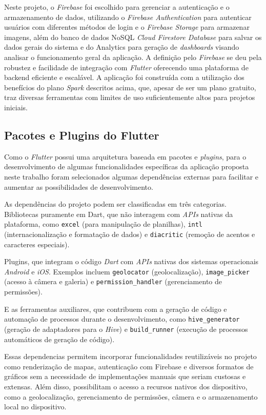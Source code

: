 Neste projeto, o \textit{Firebase} foi escolhido para gerenciar a autenticação e o armazenamento de 
dados, utilizando o \textit{Firebase Authentication} para autenticar usuários com diferentes métodos de login e 
o \textit{Firebase Storage} para armazenar imagens, além do banco de dados NoSQL 
\textit{Cloud Firestore Database} para salvar os dados gerais do sistema e do Analytics para 
geração de \textit{dashboards} visando analisar o funcionamento geral da aplicação.
A definição pelo \textit{Firebase} se deu pela robustez e facilidade de integração com \textit{Flutter} 
oferecendo uma plataforma de backend eficiente e escalável. A aplicação foi construída com a 
utilização dos benefícios do plano \textit{Spark} descritos acima,
que, apesar de ser um plano gratuito, traz diversas ferramentas com limites de uso suficientemente 
altos para projetos iniciais.

\subsection{Pacotes e Plugins do Flutter}

Como o \textit{Flutter} possui uma arquitetura baseada em pacotes e \textit{plugins}, para o desenvolvimento 
de algumas funcionalidades específicas da aplicação proposta neste trabalho foram selecionados 
algumas dependências externas para facilitar e aumentar as possibilidades de desenvolvimento.

As dependências do projeto podem ser classificadas em três categorias. Bibliotecas puramente em Dart, 
que não interagem com \textit{APIs} nativas da 
plataforma, como \texttt{excel} (para manipulação de planilhas), \texttt{intl} (internacionalização 
e formatação de dados) e \texttt{diacritic} (remoção de acentos e caracteres especiais).

Plugins, que integram o código \textit{Dart} com \textit{APIs} nativas dos 
sistemas operacionais \textit{Android} e \textit{iOS}. Exemplos incluem \texttt{geolocator}
 (geolocalização), 
\texttt{image\_picker} (acesso à câmera e galeria) e \texttt{permission\_handler} (gerenciamento 
de permissões).

E as ferramentas auxiliares, que contribuem com a geração 
de código e automação de processos durante o desenvolvimento, como \texttt{hive\_generator} 
(geração de adaptadores para o \textit{Hive}) e \texttt{build\_runner} (execução de processos automáticos de 
geração de código).

Essas dependencias permitem incorporar funcionalidades reutilizáveis no projeto 
como renderização de mapas, autenticação com Firebase e diversos formatos de gráficos 
sem a necessidade de implementações manuais que seriam custosas e extensas. 
Além disso, possibilitam o acesso a recursos nativos dos dispositivo, como a 
geolocalização, gerenciamento de permissões, câmera e o armazenamento local no dispositivo.


